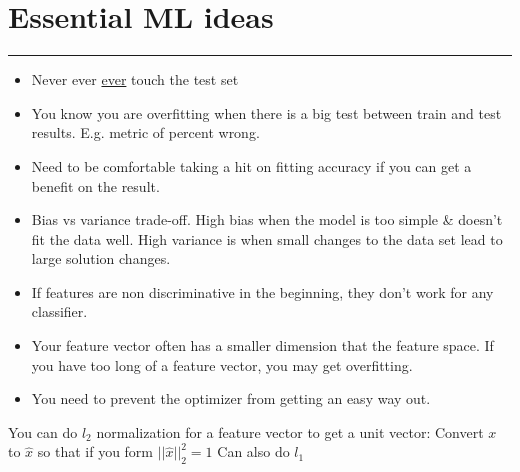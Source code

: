 \section{Essential ML ideas}
\smallskip \hrule height 2pt \smallskip

\begin{itemize}
	\item Never ever \underline{ever} touch the test set
	\item You know you are overfitting when there is a big test between train and test results.  E.g. metric of percent wrong. 
	\item Need to be comfortable taking a hit on fitting accuracy if you can get a benefit on the result.
	\item Bias vs variance trade-off.  
		High bias when the model is too simple \& doesn't fit the data well.  
		High variance is when small changes to the data set lead to large solution changes. 
	\item If features are non discriminative in the beginning, they don't work for any classifier.  %
	\item Your feature vector often has a smaller dimension that the feature space.    %
		If you have too long of a feature vector, you may get overfitting. 
	\item You need to prevent the optimizer from getting an easy way out.  %
\end{itemize}

You can do $l_2$ normalization for a feature vector to get a unit vector:   %
	Convert $x$ to $\hat{x}$ so that if you form $||\hat{x}||_2^2 = 1$
	Can also do $l_1$  
